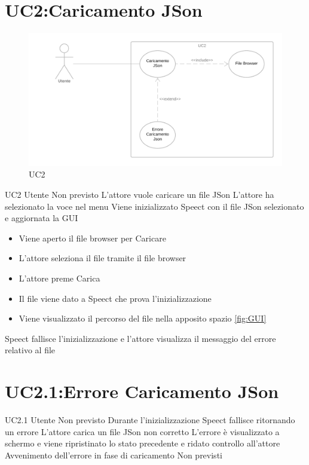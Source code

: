 \documentclass[../AnalisideiRequisiti.tex]{subfiles}
\begin{document}
	\section{UC2:Caricamento JSon}
	\begin{figure}[H]
		\caption{UC2}
		\centering
		\includegraphics[width=\textwidth]{../img/UC02.png}
	\end{figure}
	\UserCase
	{UC2}
	{Utente}
	{Non previsto}
	{L'attore vuole caricare un file JSon}
	{L'attore ha selezionato la voce nel menu}
	{Viene inizializzato Speect con il file JSon selezionato e aggiornata la GUI}
	{
		\begin{itemize}
			\item{} Viene aperto il file browser per Caricare
			\item{} L'attore seleziona il file tramite il file browser 
			\item{} L'attore preme Carica
			\item{} Il file viene dato a Speect che prova l'inizializzazione
			\item{} Viene visualizzato il percorso del file nella apposito spazio \ref{fig:GUI}
		\end{itemize}
	}
	{Speect fallisce l'inizializzazione e l'attore visualizza il messaggio del errore relativo al file }
	\section{UC2.1:Errore Caricamento JSon}
	\UserCase
	{UC2.1}
	{Utente}
	{Non previsto}
	{Durante l'inizializzazione Speect fallisce ritornando un errore }
	{L'attore carica un file JSon non corretto}
	{L'errore è visualizzato a schermo e viene ripristinato lo stato precedente e ridato controllo all'attore}
	{Avvenimento dell'errore in fase di caricamento}
	{Non previsti}
\end{document}
